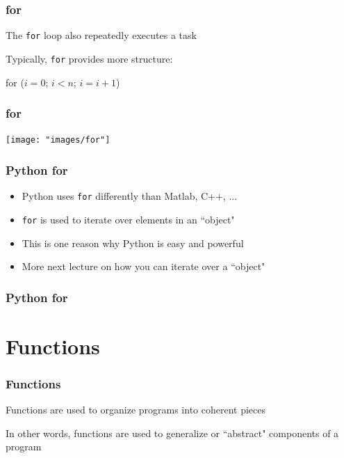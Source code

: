 \documentclass{beamer}
\begin{document}
\begin{frame}
\frametitle{for}
The \texttt{for} loop also repeatedly executes a task

\vspace{0.1in}

Typically, \texttt{for} provides more structure:

\vspace{0.1in}

\centering
for ($i = 0$; $i < n$; $i = i + 1$)

\end{frame}

\begin{frame}
\frametitle{for}

\centering
\texttt{[image: "images/for"]}
\end{frame}

\begin{frame}
\frametitle{Python for}
\begin{itemize}
\setlength{\itemsep}{0.2in}
\item{Python uses \texttt{for} differently than Matlab, C++, ...}
\item{\texttt{for} is used to iterate over elements in an ``object"}
\item{This is one reason why Python is easy and powerful}
\item{More next lecture on how you can iterate over a ``object"}
\end{itemize}

\end{frame}

\begin{frame}
\frametitle{Python for}



\end{frame}


\section{Functions}
\begin{frame}
\frametitle{Functions}
Functions are used to organize programs into coherent pieces

\vspace{0.2in}

In other words, functions are used to generalize or ``abstract" components of a program 
\end{frame}
\end{document}
